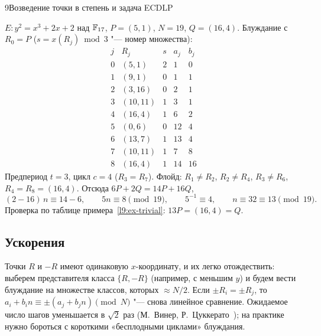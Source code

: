 \begin{lecture}{9}{Возведение точки в степень и задача ECDLP}
\begin{example}\label{l9:ex-rho}
$E\colon y^2 = x^3 + 2x + 2$ над $\mathbb{F}_{17}$, $P = (5, 1)$, $N = 19$, $Q = (16, 4)$. Блуждание
с $R_0 = P$ ($s = x(R_j) \bmod 3$ "--- номер множества):
\[
\begin{array}{r|c|c|r|r}
  j & R_j & s & a_j & b_j \\ \hline
  0 & (5, 1)   & 2 & 1  & 0  \\
  1 & (9, 1)   & 0 & 1  & 1  \\
  2 & (3, 16)  & 0 & 2  & 1  \\
  3 & (10, 11) & 1 & 3  & 1  \\
  4 & (16, 4)  & 1 & 6  & 2  \\
  5 & (0, 6)   & 0 & 12 & 4  \\
  6 & (13, 7)  & 1 & 13 & 4  \\
  7 & (10, 11) & 1 & 7  & 8  \\
  8 & (16, 4)  & 1 & 14 & 16
\end{array}
\]
Предпериод $t = 3$, цикл $c = 4$ ($R_3 = R_7$). Флойд: $R_1 \ne R_2$, $R_2 \ne R_4$,
$R_3 \ne R_6$, $R_4 = R_8 = (16, 4)$. Отсюда $6P + 2Q = 14P + 16Q$,
\[
  (2 - 16)\, n \equiv 14 - 6, \qquad 5n \equiv 8 \pmod{19}, \qquad
  5^{-1} \equiv 4, \qquad n \equiv 32 \equiv 13 \pmod{19}.
\]
Проверка по таблице примера~\ref{l9:ex-trivial}: $13P = (16, 4) = Q$.
\end{example}



\subsection{Ускорения}

\begin{remark}
Точки $R$ и $-R$ имеют одинаковую $x$-координату, и их легко отождествить: выберем
представителя класса $\{R, -R\}$ (например, с меньшим $y$) и будем вести блуждание на
множестве классов, которых $\approx N/2$. Если $\pm R_i = \pm R_j$, то
$a_i + b_i n \equiv \pm (a_j + b_j n) \pmod N$ "--- снова линейное сравнение. Ожидаемое число
шагов уменьшается в $\sqrt 2$ раз (М.~Винер, Р.~Цуккерато~\cite{wiener-zuccherato}); на
практике нужно бороться с короткими «бесплодными циклами» блуждания.
\end{remark}


\end{lecture}
